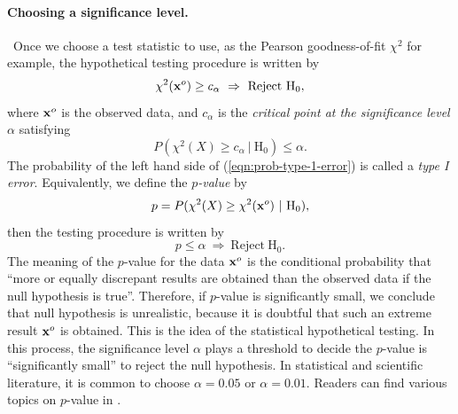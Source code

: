 \documentclass[12pt]{article}
\theoremstyle{definition}
\def\Bx{{\bf x}}
\begin{document}
\paragraph*{Choosing a significance level.}\ Once we choose a test
statistic to use, as the Pearson goodness-of-fit $\chi^2$ for example,
the hypothetical testing procedure is written by
\[
 \chi^2(\Bx^o) \geq c_{\alpha}\ \Rightarrow\ \mbox{Reject}\ \mbox{H}_0,
\]
where $\Bx^o$ is the observed data, and $c_{\alpha}$ is the {\it
critical point at the significance level $\alpha$} satisfying
\begin{equation}
 P(\chi^2(X) \geq c_{\alpha}\ |\ \mbox{H}_0) \leq \alpha.
\label{eqn:prob-type-1-error}
\end{equation}
The probability of the left hand side of (\ref{eqn:prob-type-1-error})
is called a {\it type I error}. 
Equivalently, we define the {\it $p$-value} by
\begin{equation}
 p = P(\chi^2(X) \geq \chi^2(\Bx^o)\ |\ \mbox{H}_0),
\label{eqn:p-value}
\end{equation}
then the testing procedure is written by
\[
 p \leq \alpha\ \Rightarrow\ \mbox{Reject}\ \mbox{H}_0.
\]
The meaning of the $p$-value for the data $\Bx^o$ is the conditional
probability that ``more or equally discrepant results are obtained than
the observed data if the null hypothesis is true''. 
Therefore, if $p$-value is significantly small, we conclude that null
hypothesis is unrealistic, because it is doubtful that 
such an extreme result $\Bx^o$ is obtained. This is the idea of the
statistical hypothetical testing. 
In this process, the significance level $\alpha$ plays a threshold to
decide the $p$-value is ``significantly small'' to reject the null
hypothesis.  In statistical and scientific literature, it is common to
choose $\alpha = 0.05$ or $\alpha = 0.01$. Readers can find various
topics on $p$-value in \cite{Vickers}.
\end{document}
